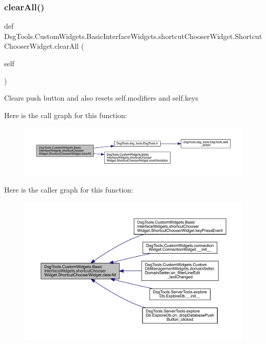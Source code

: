 \subsubsection{\texorpdfstring{clear\+All()}{clearAll()}}
{\footnotesize\ttfamily def Dsg\+Tools.\+Custom\+Widgets.\+Basic\+Interface\+Widgets.\+shortcut\+Chooser\+Widget.\+Shortcut\+Chooser\+Widget.\+clear\+All (\begin{DoxyParamCaption}\item[{}]{self }\end{DoxyParamCaption})}

\begin{DoxyVerb}Clears push button and also resets self.modifiers and self.keys
\end{DoxyVerb}
 Here is the call graph for this function\+:
\nopagebreak
\begin{figure}[H]
\begin{center}
\leavevmode
\includegraphics[width=350pt]{class_dsg_tools_1_1_custom_widgets_1_1_basic_interface_widgets_1_1shortcut_chooser_widget_1_1_shortcut_chooser_widget_ad3aafb0086fc3e56ec557bf65c4558eb_cgraph}
\end{center}
\end{figure}
Here is the caller graph for this function\+:
\nopagebreak
\begin{figure}[H]
\begin{center}
\leavevmode
\includegraphics[width=350pt]{class_dsg_tools_1_1_custom_widgets_1_1_basic_interface_widgets_1_1shortcut_chooser_widget_1_1_shortcut_chooser_widget_ad3aafb0086fc3e56ec557bf65c4558eb_icgraph}
\end{center}
\end{figure}
